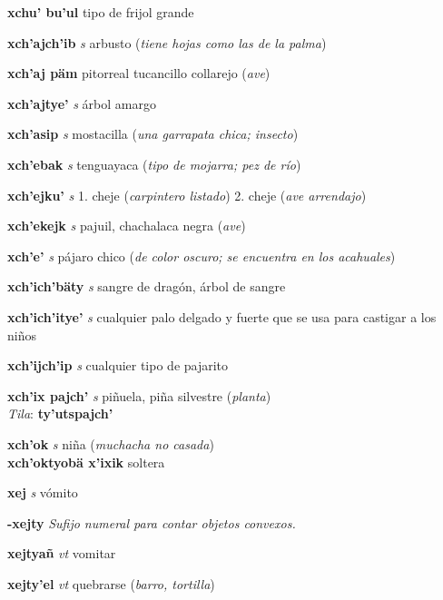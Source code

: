 \documentclass[10pt]{scrbook}
\newcommand{\entry}[1]{\textbf{#1}}
\newcommand{\onedefinition}[1]{#1.}
\newcommand{\nontranslationdef}[1]{\textit{#1}}
\newcommand{\partofspeech}[1]{\textit{#1}}
\newcommand{\spanishtranslation}[1]{#1}
\newcommand{\clarification}[1]{(\textit{#1})}
\newcommand{\dialectvariant}[1]{\\\textit{#1}:}
\newcommand{\dialectword}[1]{\textbf{#1}}
\newcommand{\secondaryentry}[1]{\\\textbf{#1}}
\newcommand{\secondtranslation}[1]{#1}
\begin{document}
\begin{multicols}{2}
\entry{xchu' bu'ul}
\spanishtranslation{tipo de frijol grande}

\entry{xch'ajch'ib}
\partofspeech{s}
\spanishtranslation{arbusto}
\clarification{tiene hojas como las de la palma}

\entry{xch'aj päm}
\spanishtranslation{pitorreal}
\spanishtranslation{tucancillo collarejo}
\clarification{ave}

\entry{xch'ajtye'}
\partofspeech{s}
\spanishtranslation{árbol amargo}

\entry{xch'asip}
\partofspeech{s}
\spanishtranslation{mostacilla}
\clarification{una garrapata chica; insecto}

\entry{xch'ebak}
\partofspeech{s}
\spanishtranslation{tenguayaca}
\clarification{tipo de mojarra; pez de río}

\entry{xch'ejku'}
\partofspeech{s}
\onedefinition{1}
\spanishtranslation{cheje}
\clarification{carpintero listado}
\onedefinition{2}
\spanishtranslation{cheje}
\clarification{ave arrendajo}

\entry{xch'ekejk}
\partofspeech{s}
\spanishtranslation{pajuil, chachalaca negra}
\clarification{ave}

\entry{xch'e'}
\partofspeech{s}
\spanishtranslation{pájaro chico}
\clarification{de color oscuro; se encuentra en los acahuales}

\entry{xch'ich'bäty}
\partofspeech{s}
\spanishtranslation{sangre de dragón, árbol de sangre}

\entry{xch'ich'itye'}
\partofspeech{s}
\spanishtranslation{cualquier palo delgado y fuerte que se usa para castigar a los niños}

\entry{xch'ijch'ip}
\partofspeech{s}
\spanishtranslation{cualquier tipo de pajarito}

\entry{xch'ix pajch'}
\partofspeech{s}
\spanishtranslation{piñuela, piña silvestre}
\clarification{planta}
\dialectvariant{Tila}
\dialectword{ty'utspajch'}

\entry{xch'ok}
\partofspeech{s}
\spanishtranslation{niña}
\clarification{muchacha no casada}
\secondaryentry{xch'oktyobä x'ixik}
\secondtranslation{soltera}

\entry{xej}
\partofspeech{s}
\spanishtranslation{vómito}

\entry{-xejty}
\nontranslationdef{Sufijo numeral para contar objetos convexos.}

\entry{xejtyañ}
\partofspeech{vt}
\spanishtranslation{vomitar}

\entry{xejty'el}
\partofspeech{vt}
\spanishtranslation{quebrarse}
\clarification{barro, tortilla}


\end{multicols}
\end{document}
